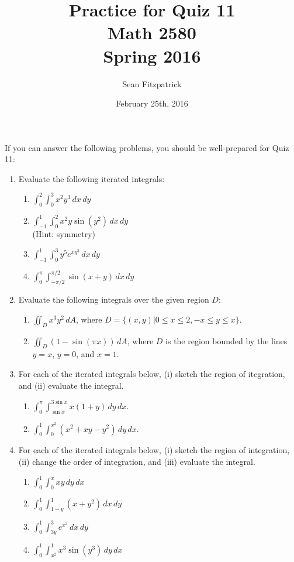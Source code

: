 \documentclass[letterpaper,12pt]{article}
\title{Practice for Quiz 11\\Math 2580\\Spring 2016}
\author{Sean Fitzpatrick}
\date{February 25th, 2016}
\newcommand{\di}{\displaystyle}
\begin{document}
 \maketitle

If you can answer the following problems, you should be well-prepared for Quiz 11:



\begin{enumerate}
 \item Evaluate the following iterated integrals:
\begin{multicols}{2}
\begin{enumerate}
 \item $\di \int_0^2\int_0^3x^2y^3\,dx\,dy$
 \item $\di \int_{-1}^1\int_0^2 x^2y\sin(y^2)\,dx\,dy$\\ (Hint: symmetry)
 \item $\di \int_{-1}^1\int_0^3 y^5e^{xy^3}\,dx\,dy$
 \item $\di \int_0^\pi\int_{-\pi/2}^{\pi/2}\sin(x+y)\,dx\,dy$
\end{enumerate}
\end{multicols}
 \item Evaluate the following integrals over the given region $D$:
\begin{enumerate}
 \item $\di \iint_D x^3y^2\,dA$, where $D=\{(x,y) | 0\leq x\leq 2, -x\leq y\leq x\}$.
 \item $\di \iint_D (1-\sin(\pi x))\,dA$, where $D$ is the region bounded by the lines $y=x$, $y=0$, and $x=1$.
\end{enumerate}
 \item For each of the iterated integrals below, (i) sketch the region of itegration, and (ii) evaluate the integral.
\begin{multicols}{2}
\begin{enumerate}
 \item $\di \int_0^\pi\int_{\sin x}^{3\sin x}x(1+y)\,dy\,dx$.
 \item $\di \int_0^1\int_0^{x^2}(x^2+xy-y^2)\,dy\,dx$.
\end{enumerate}
\end{multicols}
 \item For each of the iterated integrals below, (i) sketch the region of integration, (ii) change the order of integration, and (iii) evaluate the integral.
\begin{multicols}{2}
 \begin{enumerate}
  \item $\di \int_0^1\int_0^x xy\,dy\,dx$
  \item $\di \int_0^1\int_{1-y}^1(x+y^2)\,dx\,dy$
  \item $\di \int_0^1\int_{3y}^3 e^{x^2}\,dx\,dy$
  \item $\di \int_0^1\int_{x^2}^1 x^3\sin(y^3)\,dy\,dx$
 \end{enumerate}

\end{multicols}

 \end{enumerate}
\end{document}
